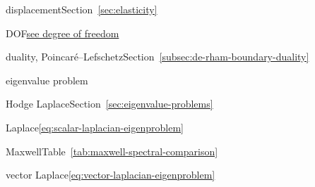 \par\noindent\hspace*{0em}\label{index:displacement}{displacement}\quad Section~\ref{sec:elasticity}

\par\noindent\hspace*{0em}\label{index:dof}{DOF}\quad \hyperref[index:degree-of-freedom-dof]{{see degree of freedom}}

\par\noindent\hspace*{0em}\label{index:duality-poincar-lefschetz}{duality, Poincaré–Lefschetz}\quad Section~\ref{subsec:de-rham-boundary-duality}

\par\noindent\hspace*{0em}\label{index:eigenvalue-problem}{eigenvalue problem}

\par\noindent\hspace*{1em}\label{index:eigenvalue-problem-hodge-laplace}{Hodge Laplace}\quad Section~\ref{sec:eigenvalue-problems}

\par\noindent\hspace*{1em}\label{index:eigenvalue-problem-laplace}{Laplace}\quad \eqref{eq:scalar-laplacian-eigenproblem}

\par\noindent\hspace*{1em}\label{index:eigenvalue-problem-maxwell}{Maxwell}\quad Table~\ref{tab:maxwell-spectral-comparison}

\par\noindent\hspace*{1em}\label{index:eigenvalue-problem-vector-laplace}{vector Laplace}\quad \eqref{eq:vector-laplacian-eigenproblem}

